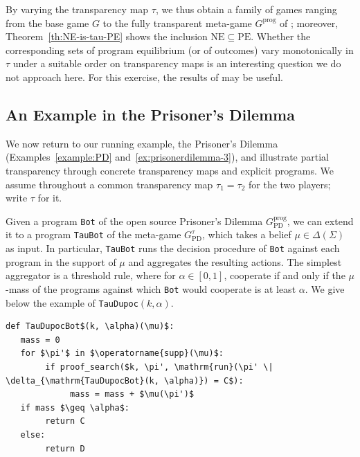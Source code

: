 \documentclass[twoside,11pt]{article}
\begin{document}
By varying the transparency map $\tau$, we thus obtain a family of games ranging from the base game $G$ to the fully transparent meta-game $G^{\mathrm{prog}}$ of \cite{tennenholtz2004program}; moreover, Theorem~\ref{th:NE-is-tau-PE} shows the inclusion $\mathrm{NE}\subseteq \mathrm{PE}$. Whether the corresponding sets of program equilibrium (or of outcomes) vary monotonically in $\tau$ under a suitable order on transparency maps is an interesting question we do not approach here. For this exercise, the results of \cite{battigalli2016analysis,formenti2026selfconfirming} may be useful.

















\subsection{An Example in the Prisoner's Dilemma}

We now return to our running example, the Prisoner's Dilemma (Examples~\ref{example:PD} and~\ref{ex:prisonerdilemma-3}), and illustrate partial transparency through concrete transparency maps and explicit programs. We assume throughout a common transparency map $\tau_1 = \tau_2$ for the two players; write $\tau$ for it.

Given a program \texttt{Bot} of the open source Prisoner's Dilemma $G_{\mathrm{PD}}^{\mathrm{prog}}$, we can extend it to a program \texttt{TauBot} of the meta-game $G_{\mathrm{PD}}^{\tau}$, which takes a belief $\mu \in \Delta(\Sigma)$ as input. In particular, \texttt{TauBot} runs the decision procedure of \texttt{Bot} against each program in the support of $\mu$ and aggregates the resulting actions. The simplest aggregator is a threshold rule, where for $\alpha \in [0,1]$, cooperate if and only if the $\mu$-mass of the programs against which \texttt{Bot} would cooperate is at least $\alpha$. We give below the example of \texttt{TauDupoc}$(k, \alpha)$.

\begin{lstlisting}[style=pdcode, mathescape=true]
def TauDupocBot$(k, \alpha)(\mu)$:
   mass = 0
   for $\pi'$ in $\operatorname{supp}(\mu)$:
        if proof_search($k, \pi', \mathrm{run}(\pi' \| \delta_{\mathrm{TauDupocBot}(k, \alpha)}) = C$):
             mass = mass + $\mu(\pi')$
   if mass $\geq \alpha$:
        return C
   else:
        return D
\end{lstlisting}
\end{document}
